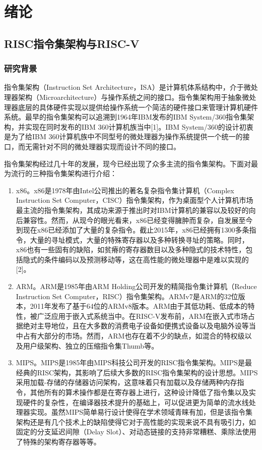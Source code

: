 \chapter{绪论}
%
\section{RISC指令集架构与RISC-V}
\subsection{研究背景}

指令集架构（Instruction Set Architecture，ISA）是计算机体系结构中，介于微处理器架构（Microarchitecture）与操作系统之间的接口。指令集架构用于抽象微处理器底层的具体硬件实现以提供给操作系统一个简洁的硬件接口来管理计算机硬件系统。最早的指令集架构可以追溯到1964年IBM发布的IBM System/360指令集架构，并实现在同时发布的IBM 360计算机族当中[1]。IBM System/360的设计初衷是为了给IBM 360计算机族中不同型号的微处理器为操作系统提供一个统一的接口，而无需针对不同的微处理器实现而设计不同的接口。

指令集架构经过几十年的发展，现今已经出现了众多主流的指令集架构。下面对最为流行的三种指令集架构进行介绍：

\begin{enumerate}
	\item 	x86。x86是1978年由Intel公司推出的著名复杂指令集计算机（Complex Instruction Set Computer，CISC）指令集架构，作为桌面型个人计算机市场最主流的指令集架构，其成功来源于推出时对IBM计算机的兼容以及较好的向后兼容性。然而，从现今的眼光看来，x86已经变得臃肿而复杂，自发展至今到现在x86已经添加了大量的复杂指令。截止2015年，x86已经拥有1300多条指令，大量的寻址模式，大量的特殊寄存器以及多种转换寻址的策略。同时，x86也有一些固有的缺陷，如贫瘠的寄存器数目以及多种隐式的技术特性，包括隐式的条件编码以及预测移动等，这在高性能的微处理器中是难以实现的[2]。
	\item	ARM。ARM是1985年由ARM Holding公司开发的精简指令集计算机（Reduce Instruction Set Computer，RISC）指令集架构。ARMv7是ARM的32位版本，2011年发布了基于64位的ARMv8版本。ARM由于其低功耗、低成本的特性，被广泛应用于嵌入式系统当中。在RISC-V发布前，ARM在嵌入式市场占据绝对主导地位，且在大多数的消费电子设备如便携式设备以及电脑外设等当中占有大部分的市场。然而，ARM也存在着不少的缺点，如混合的特权级以及用户级架构、独立的压缩指令集Thumb等。
	\item	MIPS。MIPS是1985年由MIPS科技公司开发的RISC指令集架构。MIPS是最经典的RISC架构，其影响了后续大多数的RISC指令集架构的设计思想。MIPS采用加载-存储的存储器访问架构，这意味着只有加载以及存储两种内存指令，其他所有的算术操作都是在寄存器上进行，这种设计降低了指令集以及实现硬件的复杂性，在编译器技术提升的基础上，可以促进更为简单的流水线处理器实现。虽然MIPS简单易行设计使得在学术领域青睐有加，但是该指令集架构还是有几个技术上的缺陷使得它对于高性能的实现来说不具有吸引力，如固定的分支延迟间隙（Delay Slot）、对动态链接的支持非常糟糕、乘除法使用了特殊的架构寄存器等等。
\end{enumerate}

